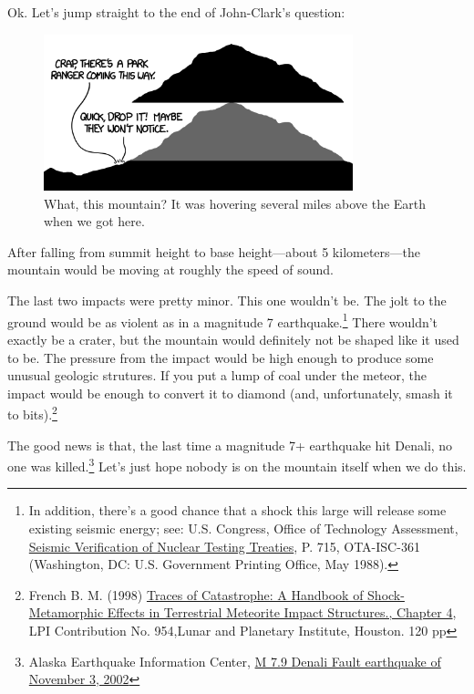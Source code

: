 {{Ok. Let's jump straight to the end of John-Clark's question:}

\begin{figure}[!htbp]
\centering
\includegraphics[scale=0.5, max width=0.8\textwidth]{imgs/a/57/mountain_summit.png}
\caption{What, this mountain? It was hovering several miles above the Earth when we got here.}
\end{figure}

{After falling from summit height to base height—about 5 kilometers—the mountain would be moving at roughly the speed of sound.}

{The last two impacts were pretty minor. This one wouldn't be. The jolt to the ground would be as violent as in a magnitude 7 earthquake.{\footnote{In addition, there's a good chance that a shock this large will release some existing seismic energy; see: U.S. Congress, Office of Technology Assessment, \href{http://www.princeton.edu/\~ota/disk2/1988/8838/883809.PDF}{Seismic Verification of Nuclear Testing Treaties}, P. 715, OTA-ISC-361 (Washington, DC: U.S. Government Printing Office, May 1988).} } There wouldn't exactly be a crater, but the mountain would definitely not be shaped like it used to be. The pressure from the impact would be high enough to produce some unusual geologic strutures. If you put a lump of coal under the meteor, the impact would be enough to convert it to diamond (and, unfortunately, smash it to bits).{\footnote{French B. M. (1998) \href{http://www.lpi.usra.edu/publications/books/CB-954/chapter4.pdf} {Traces of Catastrophe: A Handbook of Shock-Metamorphic Effects in Terrestrial Meteorite Impact Structures., Chapter 4}, LPI Contribution No. 954,Lunar and Planetary Institute, Houston. 120 pp} } }

{The good news is that, the last time a magnitude 7+ earthquake hit Denali, no one was killed.{\footnote{Alaska Earthquake Information Center, \href{http://www.aeic.alaska.edu/Denali\_Fault\_2002/}{M 7.9 Denali Fault earthquake of November 3, 2002}} } Let's just hope nobody is on the mountain itself when we do this.}

}
